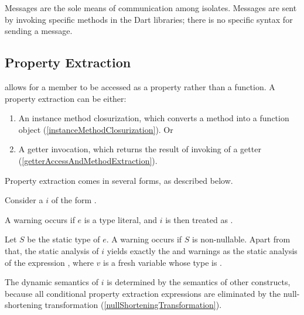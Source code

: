 \documentclass[makeidx]{article}
\begin{document}
{\LMHash{}%
Messages are the sole means of communication among isolates.
Messages are sent by invoking specific methods in the Dart libraries; there is no specific syntax for sending a message.



\subsection{Property Extraction}

\LMHash{}%
allows for a member to be accessed as a property rather than a function.
A property extraction can be either:
\begin{enumerate}
\item An instance method closurization,
  which converts a method into a function object
  (\ref{instanceMethodClosurization}).
  Or
\item A getter invocation, which returns
  the result of invoking of a getter
  (\ref{getterAccessAndMethodExtraction}).
\end{enumerate}


\LMHash{}%
Property extraction comes in several forms, as described below.

\LMHash{}%
Consider a 
$i$ of the form .

\LMHash{}%
A warning occurs if $e$ is a type literal,
and $i$ is then treated as .

\LMHash{}%
Let $S$ be the static type of $e$.
A warning occurs if $S$ is non-nullable.
Apart from that,
the static analysis of $i$ yields
exactly the  and warnings as
the static analysis of the expression ,
where $v$ is a fresh variable whose type is .

\LMHash{}%
The dynamic semantics of $i$ is determined by the semantics of other constructs,
because all conditional property extraction expressions are eliminated by the
null-shortening transformation
(\ref{nullShorteningTransformation}).
\EndCase

}
\end{document}
